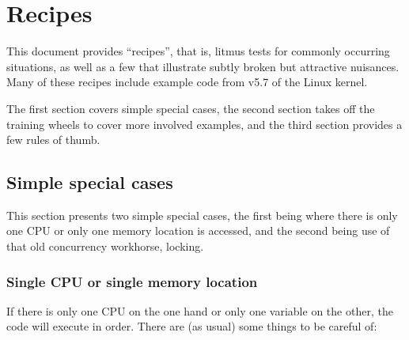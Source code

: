 \chapter{Recipes}

This document provides ``recipes'', that is, litmus tests for commonly
occurring situations, as well as a few that illustrate subtly broken but
attractive nuisances.
Many of these recipes include example code from v5.7 of the Linux kernel.

The first section covers simple special cases, the second section
takes off the training wheels to cover more involved examples,
and the third section provides a few rules of thumb.


\section{Simple special cases}

This section presents two simple special cases, the first being where
there is only one CPU or only one memory location is accessed, and the
second being use of that old concurrency workhorse, locking.


\subsection{Single CPU or single memory location}

If there is only one CPU on the one hand or only one variable
on the other, the code will execute in order.
There are (as usual) some things to be careful of:

